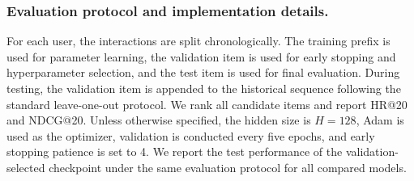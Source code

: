 \documentclass[runningheads,a4paper]{llncs}
\begin{document}
\subsubsection{Evaluation protocol and implementation details.}
For each user, the interactions are split chronologically. The training prefix is used for parameter learning, the validation item is used for early stopping and hyperparameter selection, and the test item is used for final evaluation. During testing, the validation item is appended to the historical sequence following the standard leave-one-out protocol. We rank all candidate items and report HR@20 and NDCG@20. Unless otherwise specified, the hidden size is $H=128$, Adam is used as the optimizer, validation is conducted every five epochs, and early stopping patience is set to 4. We report the test performance of the validation-selected checkpoint under the same evaluation protocol for all compared models.
\end{document}
